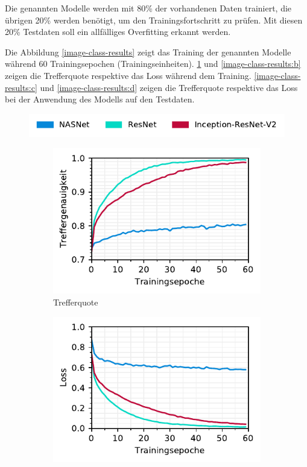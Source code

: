 Die genannten Modelle werden mit 80\% der vorhandenen Daten trainiert, die übrigen 20\% werden benötigt, um den Trainingsfortschritt zu prüfen. Mit diesen 20\% Testdaten soll ein allfälliges Overfitting erkannt werden.

Die Abbildung \ref{image-class-results} zeigt das Training der genannten Modelle während 60 Trainingsepochen (Trainingseinheiten). \ref{image-class-results:a} und \ref{image-class-results:b} zeigen die Trefferquote respektive das Loss während dem Training. \ref{image-class-results:c} und \ref{image-class-results:d} zeigen die Trefferquote respektive das Loss bei der Anwendung des Modells auf den Testdaten. 

\begin{figure}[h!] 
  \captionsetup{width=.9\linewidth}
  \caption{Statistiken aus dem Training der Bild-basierten Klassifizierung von Rechnungen}
  \label{image-class-results} 
  \includegraphics[scale=1]{graphics/matplot/img-class__legend.pdf}
  \begin{subfigure}[b]{0.5\linewidth}
    \centering
    \includegraphics[scale=1]{graphics/matplot/img-class__acc.pdf}
    \caption{Trefferquote} 
    \label{image-class-results:a} 
    \vspace{2ex}
  \end{subfigure}%
  \begin{subfigure}[b]{0.5\linewidth}
    \centering
    \includegraphics[scale=1]{graphics/matplot/img-class__loss.pdf}

\end{subfigure}
\end{figure}
